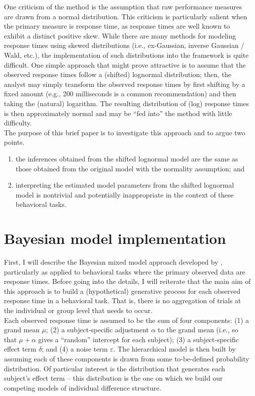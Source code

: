 \documentclass[12pt,twoside,a4paper]{article}
\begin{document}
One criticism of the \citet{haaf2017} method is the assumption that raw performance measures are drawn from a normal distribution. This criticism is particularly salient when the primary measure is response time, as response times are well known to exhibit a distinct positive skew. While there are many methods for modeling response times using skewed distributions (i.e., ex-Gaussian, inverse Gaussian / Wald, etc.), the implementation of such distributions into the \citet{haaf2017} framework is quite difficult. One simple approach that might prove attractive is to assume that the observed response times follow a (shifted) lognormal distribution; then, the analyst may simply transform the observed response times by first shifting by a fixed amount (e.g., 200 milliseconds is a common recommendation) and then taking the (natural) logarithm. The resulting distribution of (log) response times is then approximately normal and may be ``fed into'' the \citet{haaf2017} method with little difficulty.\\

The purpose of this brief paper is to investigate this approach and to argue two points.

\begin{enumerate}
\item
  the inferences obtained from the shifted lognormal model are the same as those obtained from the original model with the normality assumption; and
\item
  interpreting the estimated model parameters from the shifted lognormal model is nontrivial and potentially inappropriate in the context of these behavioral tasks.
\end{enumerate}

\section{Bayesian model implementation}

First, I will describe the Bayesian mixed model approach developed by \citet{haaf2017}, particularly as applied to behavioral tasks where the primary observed data are response times. Before going into the details, I will reiterate that the main aim of this approach is to build a (hypothetical) generative process for each observed response time in a behavioral task. That is, there is no aggregation of trials at the individual or group level that needs to occur.\\

Each observed response time is assumed to be the sum of four components: (1) a grand mean \(\mu\); (2) a subject-specific adjustment \(\alpha\) to the grand mean (i.e., so that \(\mu+\alpha\) gives a ``random'' intercept for each subject); (3) a subject-specific effect term \(\delta\); and (4) a noise term \(\varepsilon\). The hierarchical model is then built by assuming each of these components is drawn from some to-be-defined probability distribution. Of particular interest is the distribution that generates each subject's effect term -- this distribution is the one on which we build our competing models of individual difference structure.\\
\end{document}

